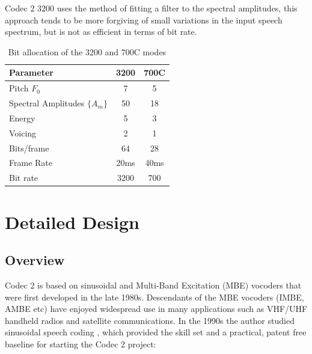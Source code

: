 \documentclass{article}
\begin{document}
{Codec 2 3200 uses the method of fitting a filter to the spectral amplitudes, this approach tends to be more forgiving of small variations in the input speech spectrum, but is not as efficient in terms of bit rate.

\begin{table}[H]
\label{tab:bit_allocation}
\centering
\begin{tabular}{l c c }
\hline
Parameter & 3200 & 700C \\
\hline
Pitch $F_0$ & 7 & 5 \\
Spectral Amplitudes $\{A_m\}$ & 50 & 18 \\
Energy & 5 & 3 \\
Voicing & 2 & 1 \\
Bits/frame & 64 & 28 \\
Frame Rate & 20ms & 40ms \\
Bit rate & 3200 & 700 \\
\hline
\end{tabular}
\caption{Bit allocation of the 3200 and 700C modes}
\end{table}

\section{Detailed Design}
\label{sect:details}

\subsection{Overview}

Codec 2 is based on sinusoidal \cite{mcaulay1986speech} and Multi-Band Excitation (MBE) \cite{griffin1988multiband} vocoders that were first developed in the late 1980s.  Descendants of the MBE vocoders (IMBE, AMBE etc) have enjoyed widespread use in many applications such as VHF/UHF handheld radios and satellite communications. In the 1990s the author studied sinusoidal speech coding \cite{rowe1997techniques}, which provided the skill set and a practical, patent free baseline for starting the Codec 2 project:

}
\end{document}

